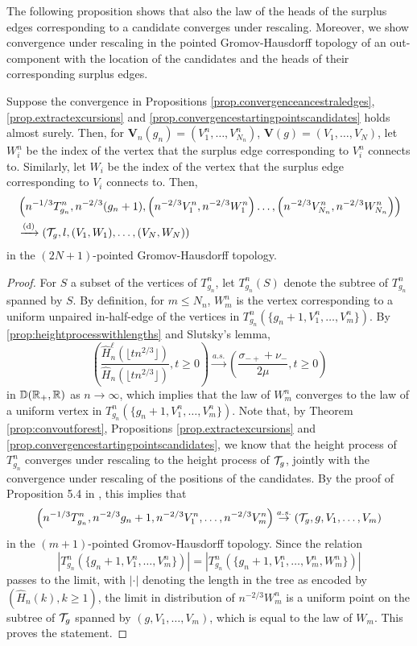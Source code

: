 The following proposition shows that also the law of the heads of the surplus edges corresponding to a candidate converges under rescaling. Moreover, we show convergence under rescaling in the pointed Gromov-Hausdorff topology of an out-component with the location of the candidates and the heads of their corresponding surplus edges. 
\begin{proposition}\label{prop.convergenceheadscandidates}
Suppose the convergence in Propositions \ref{prop.convergenceancestraledges}, \ref{prop.extractexcursions} and \ref{prop.convergencestartingpointscandidates} holds almost surely. Then, for $\mathbf{V}_n(g_n)=(V^n_1,\dots, V^n_{N_n})$, $\mathbf{V}(g)=(V_1,\dots, V_{N})$, let $W^n_i$ be the index of the vertex that the surplus edge corresponding to $V^n_i$ connects to. Similarly, let $W_i$ be the index of the vertex that the surplus edge corresponding to $V_i$ connects to. Then, 
\begin{align*}&\left(n^{-1/3}T^n_{g_n}, n^{-2/3}(g_n+1), \left(n^{-2/3}V^n_1,n^{-2/3}W^n_1\right) \dots, \left(n^{-2/3}V^n_{N_n}, n^{-2/3}W^n_{N_n}\right)\right)\\
&\todist\left(\cT_g, l, (V_1,W_1),\dots, (V_{N},W_{N})\right)\end{align*}
in the $(2N+1)$-pointed Gromov-Hausdorff topology. 
\end{proposition}
\begin{proof}
For $S$ a subset of the vertices of $T^n_{g_n}$, let $T^n_{g_n}(S)$ denote the subtree of $T^n_{g_n}$ spanned by $S$. By definition, for $m\leq N_n$, $W^n_m$ is the vertex corresponding to a uniform unpaired in-half-edge of the vertices in $T^n_{g_n}\left(\{g_n+1,V^n_1,\dots,V^n_{m}\}\right)$. By  \cref{prop:heightprocesswithlengths} and Slutsky's lemma,
$$\left(\frac{\hat{H}_n^\ell\left(\lfloor t n^{2/3}\rfloor \right)}{\hat{H}_n\left(\lfloor t n^{2/3}\rfloor \right)},t\geq 0\right)\overset{a.s.}{\to} \left(\frac{\sigma_{-+}+\nu_-}{2\mu},t\geq 0\right)$$
in ${\mathbb D}({\mathbb R}_+,{\mathbb R})$ as $n\to \infty$, which implies that the law of $W^n_m$ converges to the law of a uniform vertex in $T^n_{g_n}\left(\{g_n+1,V^n_1,\dots,V^n_{m}\}\right)$. 
Note that, by Theorem \ref{prop:convoutforest},  Propositions \ref{prop.extractexcursions} and \ref{prop.convergencestartingpointscandidates}, we know that the height process of $T^n_{g_n}$ converges under rescaling to the height process of ${\mathcal T}_g$, jointly with the convergence under rescaling of the positions of the candidates. By the proof of Proposition 5.4 in \cite{goldschmidtScalingLimitCritical2021}, this implies that
$$\left(n^{-1/3}T^n_{g_n},n^{-2/3}g_n+1,n^{-2/3}V^n_1,\dots,n^{-2/3}V^n_{m}\right)\overset{a.s.}{\to}\left({\mathcal T}_g, g,V_1,\dots,V_m\right)$$
in the $(m+1)$-pointed Gromov-Hausdorff topology. Since the relation $$\left|T^n_{g_n}\left(\{g_n+1,V^n_1,\dots,V^n_{m}\}\right)\right|=\left|T^n_{g_n}\left(\{g_n+1,V^n_1,\dots,V^n_{m}, W^n_{m}\}\right)\right|$$ passes to the limit, with $|\cdot|$ denoting the length in the tree as encoded by $(\hat{H}_n(k),k\geq 1)$, the limit in distribution of $n^{-2/3}W^n_m$ is a uniform point on the subtree of ${\mathcal T}_g$ spanned by $\left(g,V_1,\dots,V_m\right)$, which is equal to the law of $W_m$. This proves the statement.
\end{proof}

